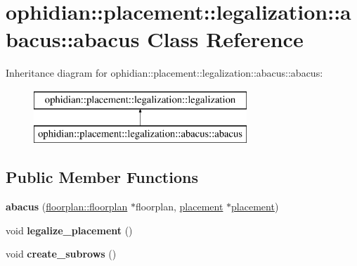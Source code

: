 \hypertarget{classophidian_1_1placement_1_1legalization_1_1abacus_1_1abacus}{\section{ophidian\-:\-:placement\-:\-:legalization\-:\-:abacus\-:\-:abacus Class Reference}
\label{classophidian_1_1placement_1_1legalization_1_1abacus_1_1abacus}
}
Inheritance diagram for ophidian\-:\-:placement\-:\-:legalization\-:\-:abacus\-:\-:abacus\-:\begin{figure}[H]
\begin{center}
\leavevmode
\includegraphics[height=2.000000cm]{classophidian_1_1placement_1_1legalization_1_1abacus_1_1abacus}
\end{center}
\end{figure}
\subsection*{Public Member Functions}
\begin{DoxyCompactItemize}
\item 
\hypertarget{classophidian_1_1placement_1_1legalization_1_1abacus_1_1abacus_ae4823481a15b943efb72dfaeb449f941}{{\bfseries abacus} (\hyperlink{classophidian_1_1floorplan_1_1floorplan}{floorplan\-::floorplan} $\ast$floorplan, \hyperlink{classophidian_1_1placement_1_1placement}{placement} $\ast$\hyperlink{classophidian_1_1placement_1_1placement}{placement})}\label{classophidian_1_1placement_1_1legalization_1_1abacus_1_1abacus_ae4823481a15b943efb72dfaeb449f941}

\item 
\hypertarget{classophidian_1_1placement_1_1legalization_1_1abacus_1_1abacus_a60527752ac52cdfcfcf611576793798d}{void {\bfseries legalize\-\_\-placement} ()}\label{classophidian_1_1placement_1_1legalization_1_1abacus_1_1abacus_a60527752ac52cdfcfcf611576793798d}

\item 
\hypertarget{classophidian_1_1placement_1_1legalization_1_1abacus_1_1abacus_aa0c73cc67da80fedbb91ecd8c3909af7}{void {\bfseries create\-\_\-subrows} ()}\label{classophidian_1_1placement_1_1legalization_1_1abacus_1_1abacus_aa0c73cc67da80fedbb91ecd8c3909af7}

\end{DoxyCompactItemize}

